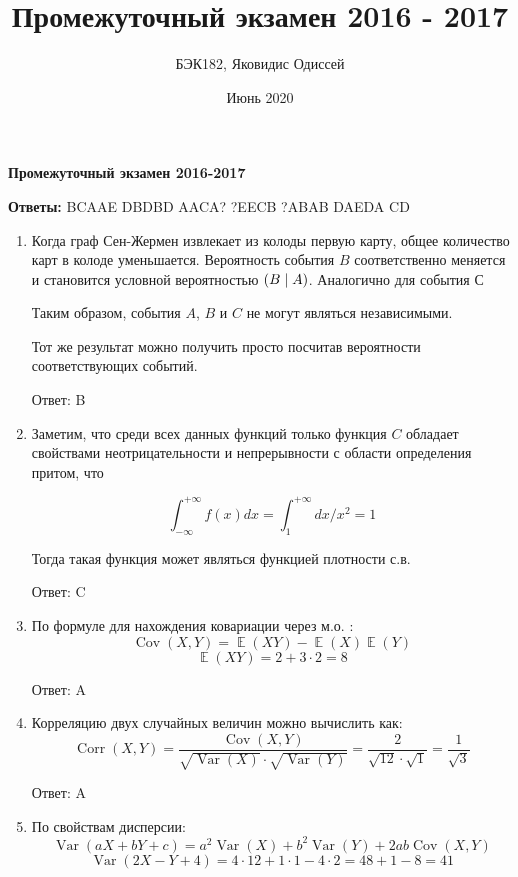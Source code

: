 \documentclass[a4paper]{article} %
\title{Промежуточный экзамен 2016 - 2017}
\author{БЭК182, Яковидис Одиссей}
\date{Июнь 2020}
\DeclareMathOperator{\Var}{Var}
\DeclareMathOperator{\Cov}{Cov}
\DeclareMathOperator{\Corr}{Corr}
\DeclareMathOperator{\E}{\mathbb{E}}
\let\P\relax
\DeclareMathOperator{\P}{\mathbb{P}}
\begin{document}
\maketitle

\vspace{\baselineskip}

\textbf{Промежуточный экзамен 2016-2017}

\textbf{Ответы:}
BCAAE DBDBD AACA? ?EECB ?ABAB DAEDA CD


\begin{enumerate}

    \item
    Когда граф Сен-Жермен извлекает из колоды первую карту, общее количество карт в колоде уменьшается. Вероятность события $B$ соответственно меняется и становится условной вероятностью $\P(B\mid A)$. 
    Аналогично для события С

    Таким образом, события $A$, $B$ и $C$ не могут являться независимыми.
    
    Тот же результат можно получить просто посчитав вероятности соответствующих событий.
    
    Ответ: B
    
    \item
    
    Заметим, что среди всех данных функций только функция $C$ обладает свойствами неотрицательности и непрерывности с области определения притом, что

    \[\int_{-\infty}^{+\infty} f(x) dx = \int_{1}^{+\infty} dx/x^2 = 1\] 
    
   Тогда такая функция может являться функцией плотности с.в.
    
    Ответ: C
    
    \item
    
    По формуле для нахождения ковариации через м.о. :
    \[\Cov(X,Y) = \E(XY) - \E(X)\E(Y)\]
    \[\E(XY) = 2 + 3\cdot2 = 8\]
    
    Ответ: A
    
    \item 
    Корреляцию двух случайных величин можно вычислить как:
    \[\Corr(X,Y) = \frac{\Cov(X,Y)}{\sqrt{\Var(X)} \cdot \sqrt{\Var(Y)}} = \frac{2}{\sqrt{12} \cdot \sqrt{1}} = \frac{1}{\sqrt{3}}\]
    
    Ответ: A
    
    \item
    По свойствам дисперсии:
    \[\Var(aX + bY + c) = a^2 \Var(X) + b^2 \Var(Y) + 2ab\Cov(X,Y)\]
    \[\Var(2X - Y + 4) = 4 \cdot 12 + 1 \cdot 1 - 4 \cdot 2 = 48 + 1 - 8 = 41\]
    

\end{enumerate}
\end{document}

